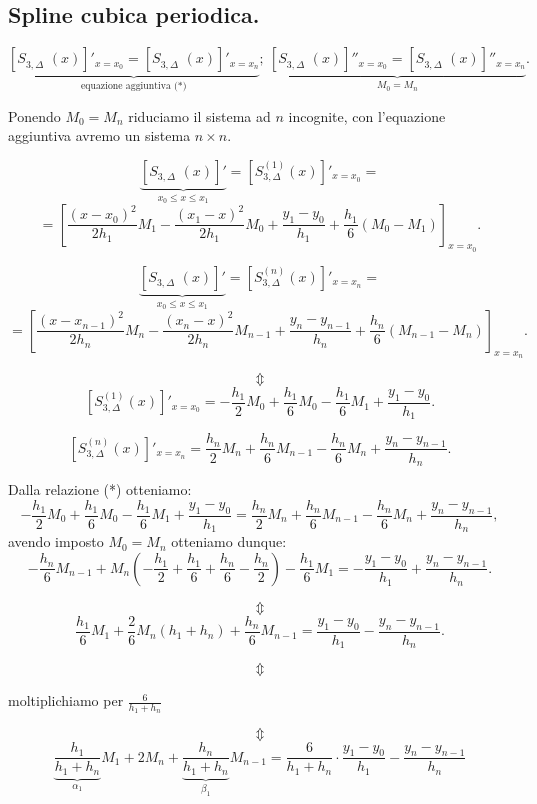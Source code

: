 \subsection{Spline cubica periodica.}

\[
\underbrace{\left[S_{3,\Delta}^{\phantom{(1)}}(x) \right]'_{x = x_0}
=\left[S_{3,\Delta}^{\phantom{(1)}}(x) \right]'_{x = x_n}}
_{\textrm{equazione aggiuntiva (*)}};
\ \underbrace{\left[S_{3,\Delta}^{\phantom{(1)}}(x) \right]''_{x = x_0}
=\left[S_{3,\Delta}^{\phantom{(1)}}(x) \right]''_{x = x_n}}_{M_0 = M_n}.
\]

Ponendo $M_0 = M_n$ riduciamo il sistema ad $n$ incognite, con l'equazione
aggiuntiva avremo un sistema $n \times n$.


\[
\underbrace{\left[S_{3,\Delta}^{\phantom{(1)}}(x) \right]'}
_{ x_0 \leq x \leq x_1} = \left[S_{3,\Delta}^{(1)}(x) \right]'_{x = x_0} =
\]
\[=
\left[
\frac{(x-x_{0})^2}{2h_1}M_1 
- \frac{(x_1-x)^2}{2h_1}M_{0} + \frac{y_{1} -y_{0}}{h_1} + 
\frac{h_1}{6}\left(M_{0}-M_1\right) \right]_{x = x_0}.
\]

\[
\underbrace{\left[S_{3,\Delta}^{\phantom{(1)}}(x) \right]'}
_{ x_0 \leq x \leq x_1} = \left[S_{3,\Delta}^{(n)}(x) \right]'_{x = x_n} =
\]
\[=
\left[
\frac{(x-x_{n-1})^2}{2h_n}M_n 
- \frac{(x_n-x)^2}{2h_n}M_{n-1} + \frac{y_{n} -y_{n-1}}{h_n} + 
\frac{h_n}{6}\left(M_{n-1}-M_n\right) \right]_{x = x_n}.
\]

\[\Updownarrow\]
\[
\left[S_{3,\Delta}^{(1)}(x) \right]'_{x = x_0} =
-\frac{h_1}{2}M_0 + \frac{h_1}{6}M_0 - \frac{h_1}{6}M_1 
+ \frac{y_{1} -y_{0}}{h_1}.
\]

\[
\left[S_{3,\Delta}^{(n)}(x) \right]'_{x = x_n} =
\frac{h_n}{2}M_{n} + \frac{h_n}{6}M_{n-1} - \frac{h_n}{6}M_n 
+ \frac{y_{n} -y_{n-1}}{h_n}.
\]

Dalla relazione (*) otteniamo:
\[
-\frac{h_1}{2}M_0 + \frac{h_1}{6}M_0 - \frac{h_1}{6}M_1 
+ \frac{y_{1} -y_{0}}{h_1} =
\frac{h_n}{2}M_{n} + \frac{h_n}{6}M_{n-1} - \frac{h_n}{6}M_n 
+ \frac{y_{n} -y_{n-1}}{h_n},
\]
avendo imposto $M_0 = M_n$ otteniamo dunque:
\[
-\frac{h_n}{6}M_{n-1} + M_n\left(-\frac{h_1}{2}+ \frac{h_1}{6}+ \frac{h_n}{6}
-\frac{h_n}{2}\right) - \frac{h_1}{6}M_1 = - \frac{y_{1} -y_{0}}{h_1} +
\frac{y_{n} -y_{n-1}}{h_n}.
\]

\[\Updownarrow\]
\[
\frac{h_1}{6}M_1 + \frac{2}{6}M_n\left(h_1+h_n\right) + \frac{h_n}{6}M_{n-1}
= \frac{y_{1} -y_{0}}{h_1} - \frac{y_{n} -y_{n-1}}{h_n}.
\]

\[\Updownarrow\]
\begin{center}moltiplichiamo per $\frac{6}{h_1 + h_n}$
\end{center}
\[\Updownarrow\]
\[
\underbrace{\frac{h_1}{h_1 + h_n}}_{\alpha_1}M_1 + 2M_n + 
\underbrace{\frac{h_n}{h_1 + h_n}}_{\beta_1}M_{n-1} = 
\frac{6}{h_1 + h_n} \cdot \frac{y_{1} -y_{0}}{h_1} - \frac{y_{n} -y_{n-1}}{h_n}
\]

